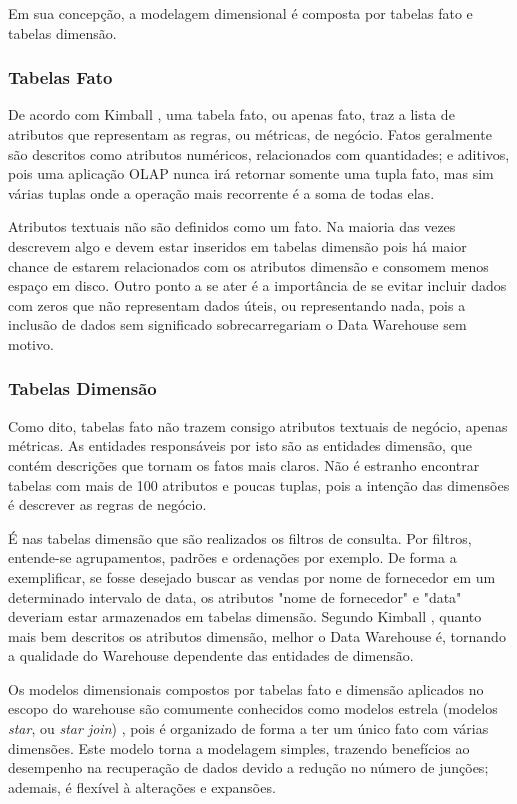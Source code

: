 \documentclass[conference]{IEEEtran}
\begin{document}
Em sua concepção, a modelagem dimensional é composta por tabelas fato e tabelas dimensão.

\subsubsection{Tabelas Fato}

De acordo com Kimball \cite{kimball2002dw}, uma tabela fato, ou apenas fato, traz a lista de atributos que representam as regras, ou métricas, de negócio. Fatos geralmente são descritos como atributos numéricos, relacionados com quantidades; e aditivos, pois uma aplicação OLAP nunca irá retornar somente uma tupla fato, mas sim várias tuplas onde a operação mais recorrente é a soma de todas elas.

Atributos textuais não são definidos como um fato. Na maioria das vezes descrevem algo e devem estar inseridos em tabelas dimensão pois há maior chance de estarem relacionados com os atributos dimensão e consomem menos espaço em disco. Outro ponto a se ater é a importância de se evitar incluir dados com zeros que não representam dados úteis, ou representando nada, pois a inclusão de dados sem significado sobrecarregariam o Data Warehouse sem motivo.

\subsubsection{Tabelas Dimensão}
Como dito, tabelas fato não trazem consigo atributos textuais de negócio, apenas métricas. As entidades responsáveis por isto são as entidades dimensão, que contém descrições que tornam os fatos mais claros. Não é estranho encontrar tabelas com mais de 100 atributos e poucas tuplas, pois a intenção das dimensões é descrever as regras de negócio.

É nas tabelas dimensão que são realizados os filtros de consulta. Por filtros, entende-se agrupamentos, padrões e ordenações por exemplo. De forma a exemplificar, se fosse desejado buscar as vendas por nome de fornecedor em um determinado intervalo de data, os atributos "nome de fornecedor" e "data" deveriam estar armazenados em tabelas dimensão. Segundo Kimball \cite{kimball2002dw}, quanto mais bem descritos os atributos dimensão, melhor o Data Warehouse é, tornando a qualidade do Warehouse dependente das entidades de dimensão.


Os modelos dimensionais compostos por tabelas fato e dimensão aplicados no escopo do warehouse são comumente conhecidos como modelos estrela (modelos \textit{star}, ou \textit{star join}) \cite{wrembel2007data, kimball2002dw, inmon2005building,sen2005comparison}, pois é organizado de forma a ter um único fato com várias dimensões. Este modelo torna a modelagem simples, trazendo benefícios ao desempenho na recuperação de dados devido a redução no número de junções; ademais, é flexível à alterações e expansões.
\end{document}

